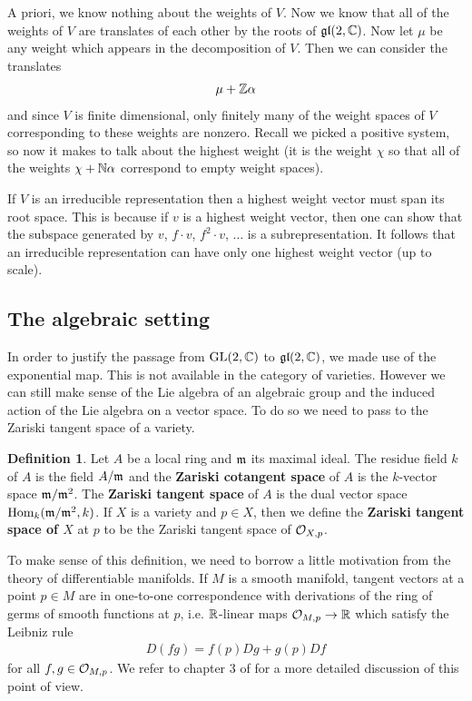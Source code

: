 \documentclass{amsart}
\numberwithin{equation}{section}
\theoremstyle{plain} %
\theoremstyle{definition}
\newtheorem{definition}[equation]{Definition}
\theoremstyle{remark}
\begin{document}
A priori, we know nothing about the weights of $V$. Now we know that all of the weights of $V$ are translates of each other by the roots of
$\operatorname{\mathfrak{gl}}(2,\mathbb{C})$. Now let $\mu$ be any weight which appears in the decomposition of $V$. Then we can consider the translates \begin{align*}
	\mu + \mathbb{Z}\alpha
\end{align*} and since $V$ is finite dimensional, only finitely many of the weight spaces of $V$ corresponding to these weights are nonzero.
Recall we picked a positive system, so now it makes to talk about the highest weight (it is the weight $\chi$ so that all of the weights $\chi + \mathbb{N}\alpha$
correspond to empty weight spaces).

\hfill

If $V$ is an irreducible representation then a highest weight vector must span its root space. This is because
if $v$ is a highest weight vector, then one can show that the subspace generated by $v$, $f\cdot v$, $f^2\cdot v$, $\ldots$ is a subrepresentation.
It follows that an irreducible representation can have only one highest weight vector (up to scale).

\subsection{The algebraic setting}
In order to justify the passage from $\operatorname{GL}(2,\mathbb{C})$ to $\operatorname{\mathfrak{gl}}(2,\mathbb{C})$, we made use of the exponential map.
This is not available in the category of varieties. However we can still make sense of the Lie algebra of an algebraic group
and the induced action of the Lie algebra on a vector space.
To do so we need to pass to the Zariski tangent space of a variety.

\begin{definition}
	Let $A$ be a local ring and $\mathfrak{m}$ its maximal ideal. The residue field $k$ of $A$ is the field $A/\mathfrak{m}$ and
	the \textbf{Zariski cotangent space} of $A$ is the $k$-vector space $\mathfrak{m}/\mathfrak{m}^2$. The
	\textbf{Zariski tangent space} of $A$ is the dual vector space $\operatorname{Hom}_k(\mathfrak{m}/\mathfrak{m}^2,k)$.
	If $X$ is a variety and $p\in X$, then we define the \textbf{ Zariski tangent space of $X$ }at $p$
	to be the Zariski tangent space of ${\mathcal{O}}_{X,p}$.
\end{definition}


To make sense of this definition, we need to borrow a little motivation from the theory of differentiable manifolds.
If $M$ is a smooth manifold, tangent vectors at a point $p\in M$ are in one-to-one correspondence
with derivations of the ring of germs of smooth functions at $p$, i.e. $\mathbb{R}$-linear maps ${\mathcal{O}}_{M,p}\to \mathbb{R}$ which satisfy the Leibniz rule
\begin{align*}
	D(fg) = f(p)Dg + g(p)Df
\end{align*} for all $f,g\in {\mathcal{O}}_{M,p}$. 
We refer to chapter 3 of \cite{lee} for a more detailed discussion of this point of view.
\end{document}
